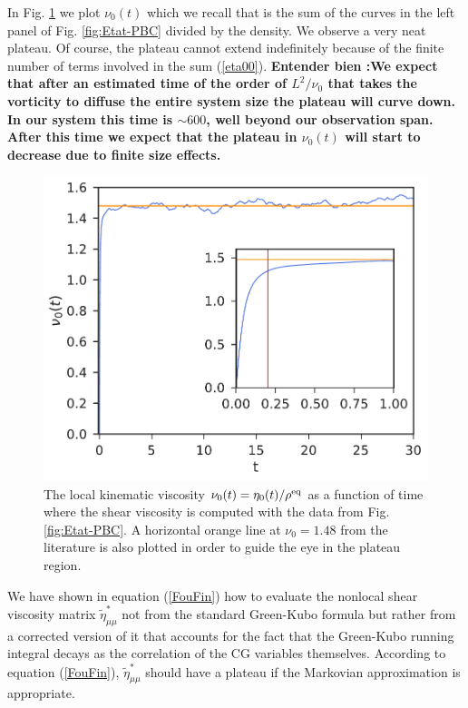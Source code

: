 \documentclass[b5paper,openright,10pt]{book}
\newcommand{\Note}[1]{{\bf \color{red}#1}}    %
\begin{document}
In Fig.
\ref{fig:KinVisc0t-PBC} we plot $\nu_0(t)$  which we recall that
is the sum  of the curves in  the left panel of Fig. \ref{fig:Etat-PBC} divided by the density. We observe  a very neat
plateau.  Of course, the plateau cannot extend indefinitely because of
the  finite number  of terms  involved  in the  sum (\ref{eta00}).  \Note{ Entender bien :We
expect that after  an estimated time of the order  of $L^2/\nu_0$ that
takes the vorticity to diffuse the entire system size the plateau will
curve down.  In our system  this time is  $\sim 600$, well  beyond our
observation  span. After  this  time  we expect  that  the plateau  in
$\nu_0(t)$ will start to decrease due to finite size effects.}
\begin{figure}[h!]
  \centering
\includegraphics[scale=0.41]{KinVisc0t-PBC}
\caption[The local kinematic viscosity for an unconfined fluid]{The local kinematic viscosity $\nu_0(t)=\eta_0(t)/\rho^{\rm eq}$ as a function of time where the shear viscosity is computed with the data from Fig. \ref{fig:Etat-PBC}. A horizontal orange line at $\nu_0=1.48$ from the literature \cite{Woodcock2006} is also plotted in order to guide the eye in the plateau region.}
\label{fig:KinVisc0t-PBC}
\end{figure}

We have shown in  equation (\ref{FouFin}) how to evaluate  the nonlocal shear
viscosity  matrix  $\tilde{\eta}^*_{\mu\mu}$  not  from  the  standard
Green-Kubo  formula but  rather from  a corrected  version of  it that
accounts for the  fact that the Green-Kubo running  integral decays as
the correlation of  the CG variables themselves. 
According  to equation (\ref{FouFin}), $\tilde{\eta}^{*}_{\mu\mu}$  should have a plateau  if the
Markovian approximation is appropriate.
\end{document}

